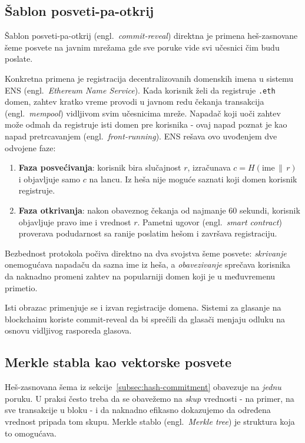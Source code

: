 \subsection{Šablon posveti-pa-otkrij}
\label{subsec:commit-reveal}

Šablon posveti-pa-otkrij (engl.\ \textit{commit-reveal}) direktna je primena heš-zasnovane
šeme posvete na javnim mrežama gde sve poruke vide svi učesnici čim budu poslate.

Konkretna primena je registracija decentralizovanih domenskih imena u sistemu ENS
(engl.\ \textit{Ethereum Name Service}). Kada korisnik želi da registruje \texttt{.eth}
domen, zahtev kratko vreme provodi u javnom redu čekanja transakcija (engl.\ \textit{mempool})
vidljivom svim učesnicima mreže. Napadač koji uoči zahtev može odmah da registruje isti
domen pre korisnika - ovaj napad poznat je kao napad pretrcavanjem
(engl.\ \textit{front-running}). ENS rešava ovo uvođenjem dve odvojene faze:

\begin{enumerate}
  \item \textbf{Faza posvećivanja}: korisnik bira slučajnost $r$, izračunava
    $c = H(\text{ime} \,\|\, r)$ i objavljuje samo $c$ na lancu. Iz heša nije moguće
    saznati koji domen korisnik registruje.
  \item \textbf{Faza otkrivanja}: nakon obaveznog čekanja od najmanje 60 sekundi,
    korisnik objavljuje pravo ime i vrednost $r$. Pametni ugovor
    (engl.\ \textit{smart contract}) proverava podudarnost sa ranije poslatim hešom i
    završava registraciju.
\end{enumerate}

Bezbednost protokola počiva direktno na dva svojstva šeme posvete: \emph{skrivanje}
onemogućava napadaču da sazna ime iz heša, a \emph{obavezivanje} sprečava korisnika da
naknadno promeni zahtev na popularniji domen koji je u međuvremenu primetio.

Isti obrazac primenjuje se i izvan registracije domena. Sistemi za glasanje na blockchainu
koriste commit-reveal da bi sprečili da glasači menjaju odluku na osnovu vidljivog rasporeda
glasova.

\subsection{Merkle stabla kao vektorske posvete}
\label{subsec:merkle}

Heš-zasnovana šema iz sekcije~\ref{subsec:hash-commitment} obavezuje na \emph{jednu} poruku.
U praksi često treba da se obavežemo na \emph{skup} vrednosti - na primer, na sve
transakcije u bloku - i da naknadno efikasno dokazujemo da određena vrednost pripada
tom skupu. Merkle stablo (engl.\ \textit{Merkle tree}) je struktura koja to omogućava.

